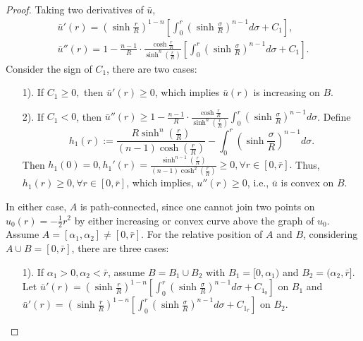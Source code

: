 \begin{proof}
	Taking two derivatives of $\bar{u}$, 
	\begin{align*}
	\bar{u}'(r) = (\sinh\frac{r}{R})^{1-n} [\int_{0}^{r} (\sinh\frac{\sigma }{R})^{n-1} d\sigma  +C_1],\\
	\bar{u}''(r) = 1-\frac{n-1}{R}\cdot \frac{\cosh \frac{r}{R}}{\sinh^n(\frac{r}{R})}[\int_{0}^{r} (\sinh\frac{\sigma }{R})^{n-1} d\sigma +C_1].
	\end{align*}
	Consider the sign of $C_1$, there are two cases:
	\begin{itemize}
		\item[1).]  If $C_1 \ge 0,$ then $\bar{u}'(r)\ge 0$, which implies $\bar{u}(r)$ is increasing on $B$.
		\item[2).] If $C_1<0$, then $\bar{u}''(r)\ge 1-\frac{n-1}{R}\cdot \frac{\cosh \frac{r}{R}}{\sinh^n(\frac{r}{R})}\int_{0}^{r} (\sinh\frac{\sigma }{R})^{n-1} d\sigma $. Define 
		$$h_1(r):= \frac{R\sinh^n(\frac{r}{R})}{(n-1)\cosh(\frac{r}{R})} - \int_{0}^{r} (\sinh\frac{\sigma }{R})^{n-1} d\sigma.$$ 
		Then $h_1(0)=0, h_1'(r) = \frac{\sinh^{n-1}(\frac{r}{R})}{(n-1)\cosh^2(\frac{r}{R})}\ge 0, \forall r\in [0, \bar{r}].$ Thus, $h_1(r) \ge 0 , \forall r\in [0, \bar{r}]$, which implies, $u''(r)\ge 0$, i.e., $\bar{u}$ is convex on $B$.
	\end{itemize}
	In either case, $A$ is path-connected, since one cannot join two points on $u_{0}(r) = -\frac{1}{2}r^2$ by either increasing or convex curve above the graph of $u_{0}$.\\
	Assume $A=[\alpha_1, \alpha_2] \neq [0, \bar{r}]$. For the relative position of $A$ and $B$, considering $A \cup B =[0,\bar{r}]$, there are three cases:
	\begin{itemize}
		\item [1).] If $\alpha_1>0, \alpha_2<\bar{r}$, assume $B = B_1 \cup B_2$ with $B_1 = [0, \alpha_1)$ and $B_2 = (\alpha_2, \bar{r}]$. Let $	\bar{u}'(r) = (\sinh\frac{r}{R})^{1-n} [\int_{0}^{r} (\sinh\frac{\sigma }{R})^{n-1} d\sigma  +C_{1_0}]$ on $B_1$ and 	$\bar{u}'(r) = (\sinh\frac{r}{R})^{1-n} [\int_{0}^{r} (\sinh\frac{\sigma }{R})^{n-1} d\sigma  + C_{1_{\bar{r}}}]$ on $B_2$.

\end{itemize}
\end{proof}
